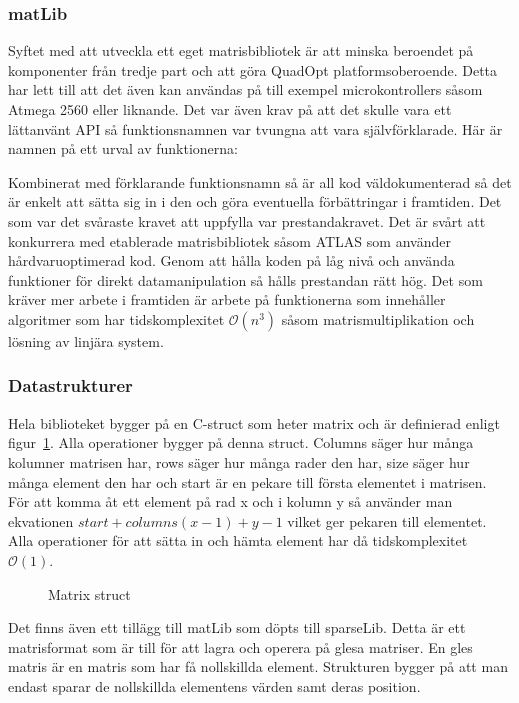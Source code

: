 \subsubsection{matLib}
Syftet med att utveckla ett eget matrisbibliotek är att minska beroendet på komponenter från tredje part och att göra QuadOpt platformsoberoende. Detta har lett till att det även kan användas på till exempel microkontrollers såsom Atmega 2560 eller liknande.
Det var även krav på att det skulle vara ett lättanvänt API så funktionsnamnen var tvungna att vara självförklarade. Här är namnen på ett urval av funktionerna:

Kombinerat med förklarande funktionsnamn så är all kod väldokumenterad så det är enkelt att sätta sig in i den och göra eventuella förbättringar i framtiden.
\newline
\newline
Det som var det svåraste kravet att uppfylla var prestandakravet. Det är svårt att konkurrera med etablerade matrisbibliotek såsom ATLAS som använder hårdvaruoptimerad kod. Genom att hålla koden på låg nivå och använda funktioner för direkt datamanipulation så hålls prestandan rätt hög. Det som kräver mer arbete i framtiden är arbete på funktionerna som innehåller algoritmer som har tidskomplexitet $\mathcal{O}(n^3)$ såsom matrismultiplikation och lösning av linjära system.



\subsubsection{Datastrukturer}
Hela biblioteket bygger på en C-struct som heter matrix och är definierad enligt figur~\ref{fig:matrix_struct}. Alla operationer bygger på denna struct. Columns säger hur många kolumner matrisen har, rows säger hur många rader den har, size säger hur många element den har och start är en pekare till första elementet i matrisen. För att komma åt ett element på rad x och i kolumn y så använder man ekvationen $start+columns(x-1)+y-1$ vilket ger pekaren till elementet. Alla operationer för att sätta in och hämta element har då tidskomplexitet $\mathcal{O}(1)$.
\begin{figure}[H]

\caption{Matrix struct}
\label{fig:matrix_struct}
\end{figure}


Det finns även ett tillägg till matLib som döpts till sparseLib. Detta är ett matrisformat som är till för att lagra och operera på glesa matriser. En gles matris är en matris som har få nollskillda element. Strukturen bygger på att man endast sparar de nollskillda elementens värden samt deras position. 

